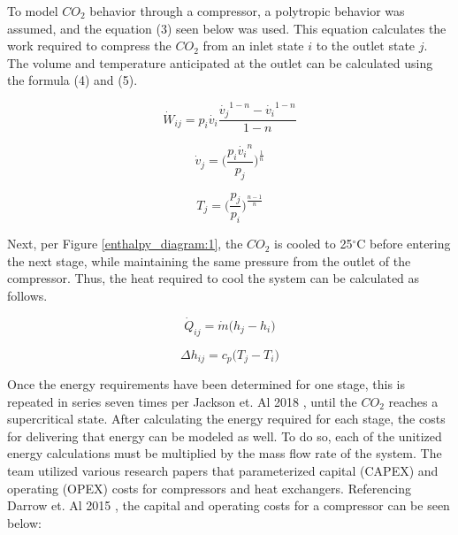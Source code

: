 \documentclass[balance,upint,subscriptcorrection,varvw,mathalfa=cal=boondoxo,spanish,french,vietnamese,russian,greek,pdf-a,colorlinks]{asmeconf}
\begin{document}
To model \begin{math}{CO_2} \end{math} behavior through a compressor, a polytropic behavior was assumed, and the equation (3) seen below was used. This equation calculates the work required to compress the \begin{math}{CO_2} \end{math} from an inlet state \begin{math}{i} \end{math} to the outlet state \begin{math}{j} \end{math}. The volume and temperature anticipated at the outlet can be calculated using the formula (4) and (5). 

\begin{equation}
    \dot{W}_{ij} = p_i \dot{v_i} \frac{\dot{v_j}^{1-n}-\dot{v_i} ^{1-n}}{1-n} 
\end{equation}

\begin{equation}
    \dot{v}_j = \bigg(\frac{p_i \dot{v_i}^n}{p_j}\bigg)^\frac{1}{n} 
\end{equation}

\begin{equation}
    T_j = \bigg(\frac{p_j}{p_i}\bigg)^\frac{n-1}{n} 
\end{equation}

Next, per Figure \ref{enthalpy_diagram:1}, the \begin{math}{CO_2} \end{math} is cooled to 25$^{\circ}$C before entering the next stage, while maintaining the same pressure from the outlet of the compressor. Thus, the heat required to cool the system can be calculated as follows.

\begin{equation}
    \dot{Q}_{ij} = \dot{m} \big(h_j-h_i)
\end{equation}

\begin{equation}
    \Delta h_{ij} = c_p\big(T_j-T_i)
\end{equation}

Once the energy requirements have been determined for one stage, this is repeated in series seven times per Jackson et. Al 2018 \cite{jackson_2018}, until the \begin{math}{CO_2} \end{math} reaches a supercritical state. 
After calculating the energy required for each stage, the costs for delivering that energy can be modeled as well. To do so, each of the unitized energy calculations must be multiplied by the mass flow rate of the system. The team utilized various research papers that parameterized capital (CAPEX) and operating (OPEX) costs for compressors and heat exchangers. Referencing Darrow et. Al 2015 \cite{darrow}, the capital and operating costs for a compressor can be seen below:
\end{document}
